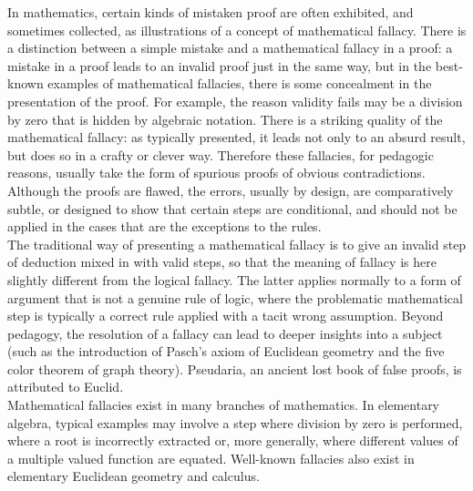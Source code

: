\documentclass[mstat,12pt]{unswthesis}  %
\numberwithin{equation}{section}
\begin{document}
In mathematics, certain kinds of mistaken proof are often exhibited, and sometimes collected, as illustrations of a concept of mathematical fallacy. There is a distinction between a simple mistake and a mathematical fallacy in a proof: a mistake in a proof leads to an invalid proof just in the same way, but in the best-known examples of mathematical fallacies, there is some concealment in the presentation of the proof. For example, the reason validity fails may be a division by zero that is hidden by algebraic notation. There is a striking quality of the mathematical fallacy: as typically presented, it leads not only to an absurd result, but does so in a crafty or clever way. Therefore these fallacies, for pedagogic reasons, usually take the form of spurious proofs of obvious contradictions. Although the proofs are flawed, the errors, usually by design, are comparatively subtle, or designed to show that certain steps are conditional, and should not be applied in the cases that are the exceptions to the rules. \\

\noindent The traditional way of presenting a mathematical fallacy is to give an invalid step of deduction mixed in with valid steps, so that the meaning of fallacy is here slightly different from the logical fallacy. The latter applies normally to a form of argument that is not a genuine rule of logic, where the problematic mathematical step is typically a correct rule applied with a tacit wrong assumption. Beyond pedagogy, the resolution of a fallacy can lead to deeper insights into a subject (such as the introduction of Pasch's axiom of Euclidean geometry and the five color theorem of graph theory). Pseudaria, an ancient lost book of false proofs, is attributed to Euclid. \\

\noindent Mathematical fallacies exist in many branches of mathematics. In elementary algebra, typical examples may involve a step where division by zero is performed, where a root is incorrectly extracted or, more generally, where different values of a multiple valued function are equated. Well-known fallacies also exist in elementary Euclidean geometry and calculus.






\clearpage
{}

\end{document}
